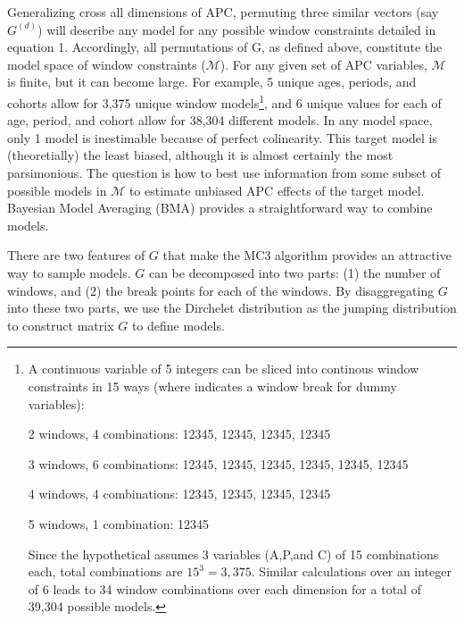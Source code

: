 \documentclass[]{article}
\begin{document}
Generalizing cross all dimensions of APC, permuting three similar
vectors (say \(G^{(d)}\)) will describe any model for any possible
window constraints detailed in equation 1. Accordingly, all permutations
of G, as defined above, constitute the model space of window constraints
(\(\mathscr{M}\)). For any given set of APC variables, \(\mathscr{M}\)
is finite, but it can become large. For example, 5 unique ages, periods,
and cohorts allow for 3,375 unique window models\footnote{A continuous
  variable of 5 integers can be sliced into continous window constraints
  in 15 ways (where \textbar{} indicates a window break for dummy
  variables):

  2 windows, 4 combinations: 1\textbar{}2345, 12\textbar{}345,
  123\textbar{}45, 1234\textbar{}5

  3 windows, 6 combinations: 1\textbar{}2\textbar{}345,
  1\textbar{}23\textbar{}45, 1\textbar{}234\textbar{}5,
  12\textbar{}3\textbar{}45, 12\textbar{}34\textbar{}5,
  123\textbar{}4\textbar{}5

  4 windows, 4 combinations: 1\textbar{}2\textbar{}3\textbar{}45,
  1\textbar{}2\textbar{}34\textbar{}5,
  1\textbar{}23\textbar{}4\textbar{}5,
  12\textbar{}3\textbar{}4\textbar{}5

  5 windows, 1 combination:
  1\textbar{}2\textbar{}3\textbar{}4\textbar{}5

  Since the hypothetical assumes 3 variables (A,P,and C) of 15
  combinations each, total combinations are \(15^3=3,375\). Similar
  calculations over an integer of 6 leads to 34 window combinations over
  each dimension for a total of 39,304 possible models.}, and 6 unique
values for each of age, period, and cohort allow for 38,304 different
models. In any model space, only 1 model is inestimable because of
perfect colinearity. This target model is (theoretially) the least
biased, although it is almost certainly the most parsimonious. The
question is how to best use information from some subset of possible
models in \(\mathscr{M}\) to estimate unbiased APC effects of the target
model. Bayesian Model Averaging (BMA) provides a straightforward way to
combine models.

There are two features of \(G\) that make the MC3 algorithm provides an
attractive way to sample models. \(G\) can be decomposed into two parts:
(1) the number of windows, and (2) the break points for each of the
windows. By disaggregating \(G\) into these two parts, we use the
Dirchelet distribution as the jumping distribution to construct matrix
\(G\) to define models.
\end{document}
